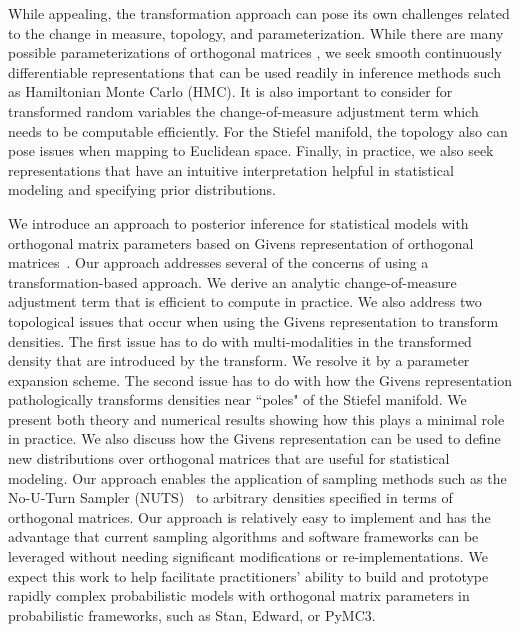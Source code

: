 \documentclass[ba]{imsart}
\numberwithin{equation}{section}
\theoremstyle{plain}
\begin{document}
\noindent While appealing, the transformation approach can pose its own challenges related to the change in measure, topology, and parameterization. While there are many possible parameterizations of orthogonal matrices \citep{anderson1987generation, shepard2015representation}, we seek smooth continuously differentiable representations that can be used readily in inference methods such as Hamiltonian Monte Carlo (HMC). It is also important to consider for transformed random variables the change-of-measure adjustment term which needs to be computable efficiently. For the Stiefel manifold, the topology also can pose issues when mapping to Euclidean space. Finally, in practice, we also seek representations that have an intuitive interpretation helpful in statistical modeling and specifying prior distributions.

\noindent We introduce an approach to posterior inference for statistical models with orthogonal matrix parameters based on Givens representation of orthogonal matrices~\citep{shepard2015representation}. Our approach addresses several of the concerns of using a transformation-based approach. We derive an analytic change-of-measure adjustment term that is efficient to compute in practice. We also address two topological issues that occur when using the Givens representation to transform densities. The first issue has to do with multi-modalities in the transformed density that are introduced by the transform. We resolve it by a parameter expansion scheme. The second issue has to do with how the Givens representation pathologically transforms densities near ``poles" of the Stiefel manifold. We present both theory and numerical results showing how this plays a minimal role in practice. We also discuss how the Givens representation can be used to define new distributions over orthogonal matrices that are useful for statistical modeling. Our approach enables the application of sampling methods such as the No-U-Turn Sampler (NUTS)~\citep{hoffman2014no} to arbitrary densities specified in terms of orthogonal matrices. Our approach is relatively easy to implement and has the advantage that current sampling algorithms and software frameworks can be leveraged without needing significant modifications or re-implementations. We expect this work to help facilitate practitioners' ability to build and prototype rapidly complex probabilistic models with orthogonal matrix parameters in probabilistic frameworks, such as Stan, Edward, or PyMC3. 
\end{document}

